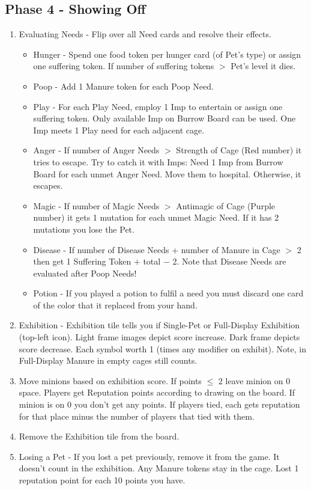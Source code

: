 \documentclass[12pt]{article}
\newenvironment{enumerateCustom}
{\begin{enumerate}
  \setlength{\itemsep}{1pt}
  \setlength{\parskip}{0pt}
  \setlength{\parsep}{0pt}}
{\end{enumerate}}
\newenvironment{itemizeCustom}
{\begin{itemize}
  \setlength{\itemsep}{1pt}
  \setlength{\parskip}{0pt}
  \setlength{\parsep}{0pt}}
{\end{itemize}}
\begin{document}
\begin{multicols*}{2}
\subsection*{Phase 4 - Showing Off}
\begin{enumerateCustom}
	\item Evaluating Needs - Flip over all Need cards and resolve their effects.
	\begin{itemizeCustom}
		\item Hunger - Spend one food token per hunger card (of Pet's type) or assign one suffering token. If number of suffering tokens $>$ Pet's level it dies.
		\item Poop - Add 1 Manure token for each Poop Need.
		\item Play - For each Play Need, employ 1 Imp to entertain or assign one suffering token. Only available Imp on Burrow Board can be used. One Imp meets 1 Play need for each adjacent cage.
		\item Anger - If number of Anger Needs $>$ Strength of Cage (Red number) it tries to escape. Try to catch it with Imps: Need 1 Imp from Burrow Board for each unmet Anger Need. Move them to hospital. Otherwise, it escapes.
		\item Magic - If number of Magic Needs $>$ Antimagic of Cage (Purple number) it gets 1 mutation for each unmet Magic Need. If it has 2 mutations you lose the Pet.
		\item Disease - If number of Disease Needs + number of Manure in Cage $>$ 2 then get 1 Suffering Token $+$ total $-$ 2. Note that Disease Needs are evaluated after Poop Needs!
		\item Potion - If you played a potion to fulfil a need you must discard one card of the color that it replaced from your hand.
	\end{itemizeCustom}
	\item Exhibition - Exhibition tile tells you if Single-Pet or Full-Display Exhibition (top-left icon). Light frame images depict score increase. Dark frame depicts score decrease. Each symbol worth 1 (times any modifier on exhibit). Note, in Full-Display Manure in empty cages still counts.
	\item Move minions based on exhibition score. If points $\le$ 2 leave minion on 0 space. Players get Reputation points according to drawing on the board. If minion is on 0 you don't get any points. If players tied, each gets reputation for that place minus the number of players that tied with them.
	\item Remove the Exhibition tile from the board.
	\item Losing a Pet - If you lost a pet previously, remove it from the game. It doesn't count in the exhibition. Any Manure tokens stay in the cage. Lost 1 reputation point for each 10 points you have.
\end{enumerateCustom}


\end{multicols*}
\end{document}

